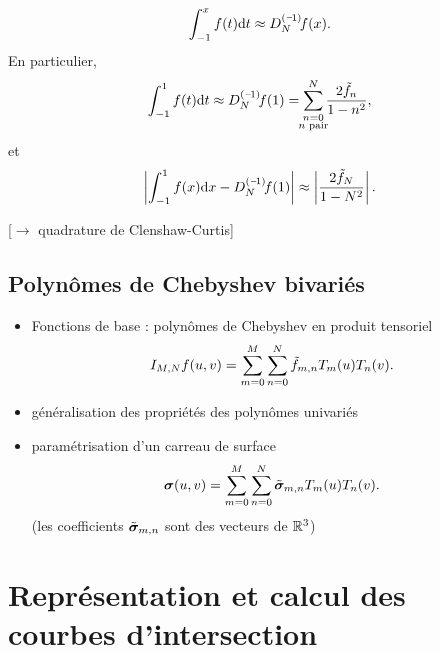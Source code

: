 \begin{equation}
	\int_{-1}^{x} f(t) \dx{t} 
	\approx \interpprim{f}{N}(x).
\end{equation}
En particulier,
\begin{equation}
	\int_{-1}^{1} f(t) \dx{t} 
	\approx 
	\interpprim{f}{N}(1)
	=
	\sum_{\mathclap{\substack{n = 0\\n \text{ pair}}}}^{N} \frac{2 \tilde{f}_n}{1 - n^2},
\end{equation}
et
\begin{equation}
	\left| \int_{-1}^{1} f(x) \dx{x} - \interpprim{f}{N}(1) \right|
	\approx
	\left|\frac{2 \tilde{f}_{N}}{1 - N^2}\right|.
\end{equation}

[$\to$ quadrature de Clenshaw-Curtis]








\subsection{Polynômes de Chebyshev bivariés}
\begin{itemize}
	\item Fonctions de base : polynômes de Chebyshev en produit tensoriel
	\[ \interpolant{f}{M,N}(u,v) = \sum_{m=0}^{M} \sum_{n=0}^{N} \tilde{f}_{m,n} T_m(u) T_n(v). \]
	\item généralisation des propriétés des polynômes univariés
	\item paramétrisation d'un carreau de surface
	\begin{equation}
		\bs(u,v) = \sum_{m=0}^{M} \sum_{n=0}^{N} \tilde{\bs}_{m,n} T_m(u) T_n(v).
	\end{equation}
	(les coefficients $\tilde{\bs}_{m,n}$ sont des vecteurs de $\reals^3$)
\end{itemize}

%

\section{Représentation et calcul des courbes d'intersection}
\label{section:representation_intersections}

